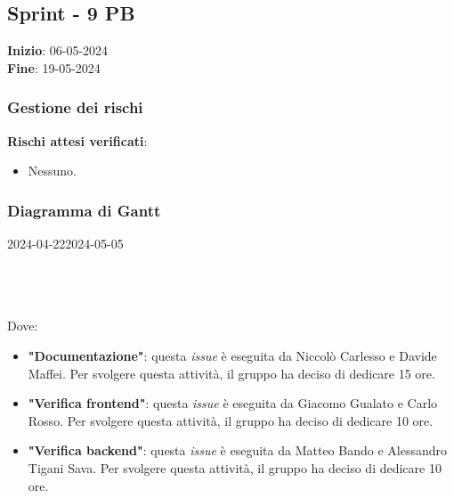 \subsection{Sprint - 9 PB}
\textbf{Inizio}: 06-05-2024 \\
\textbf{Fine}: 19-05-2024 \\

\subsubsection{Gestione dei rischi}
\textbf{Rischi attesi verificati}:

\begin{itemize}
	\item Nessuno.
\end{itemize}

\subsubsection{Diagramma di Gantt}

\begin{ganttchart}[
		x unit=0.6cm, %
		y unit chart=0.6cm,
		bar/.style={fill=blue!50},
		bar height=0.5,
		time slot format=isodate,
		time slot unit=day,
		vgrid,
		today=2024-04-22,
		today rule/.style={draw=red, ultra thick}
	]{2024-04-22}{2024-05-05}
	 \\
	 \\
	 \\
	 \\
\end{ganttchart}

Dove:
\begin{itemize}
	\item \textbf{"Documentazione"}: questa \textit{issue} è eseguita da Niccolò Carlesso e Davide Maffei. Per svolgere questa attività, il gruppo ha deciso di dedicare 15 ore.
	\item \textbf{"Verifica frontend"}: questa \textit{issue} è eseguita da Giacomo Gualato e Carlo Rosso. Per svolgere questa attività, il gruppo ha deciso di dedicare 10 ore.
	\item \textbf{"Verifica backend"}: questa \textit{issue} è eseguita da Matteo Bando e Alessandro Tigani Sava. Per svolgere questa attività, il gruppo ha deciso di dedicare 10 ore.
\end{itemize}

